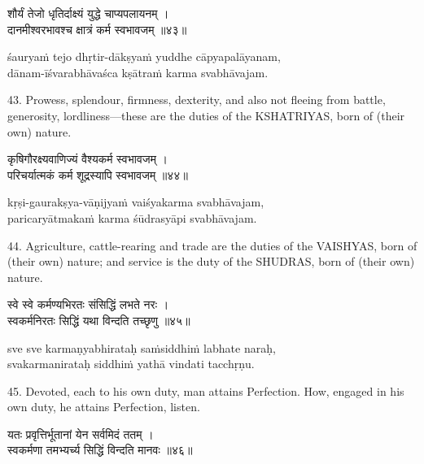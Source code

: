 \begin{gitaverse}
शौर्यं तेजो धृतिर्दाक्ष्यं युद्धे चाप्यपलायनम् । \\
दानमीश्वरभावश्च क्षात्रं कर्म स्वभावजम् ॥४३॥
\end{gitaverse}

\begin{transliteration}
śauryaṁ tejo dhṛtir-dākṣyaṁ yuddhe cāpyapalāyanam, \\
dānam-īśvarabhāvaśca kṣātraṁ karma svabhāvajam.
\end{transliteration}

43. Prowess, splendour, firmness, dexterity, and also not fleeing from battle,
generosity, lordliness---these are the duties of the KSHATRIYAS, born of (their
own) nature.

\begin{gitaverse}
कृषिगौरक्ष्यवाणिज्यं वैश्यकर्म स्वभावजम् । \\
परिचर्यात्मकं कर्म शूद्रस्यापि स्वभावजम् ॥४४॥
\end{gitaverse}

\begin{transliteration}
kṛṣi-gaurakṣya-vāṇijyaṁ vaiśyakarma svabhāvajam, \\
paricaryātmakaṁ karma śūdrasyāpi svabhāvajam.
\end{transliteration}

44. Agriculture, cattle-rearing and trade are the duties of the VAISHYAS, born
of (their own) nature; and service is the duty of the SHUDRAS, born of (their
own) nature.

\begin{gitaverse}
स्वे स्वे कर्मण्यभिरतः संसिद्धिं लभते नरः । \\
स्वकर्मनिरतः सिद्धिं यथा विन्दति तच्छृणु ॥४५॥
\end{gitaverse}

\begin{transliteration}
sve sve karmaṇyabhirataḥ saṁsiddhiṁ labhate naraḥ, \\
svakarmanirataḥ siddhiṁ yathā vindati tacchṛṇu.
\end{transliteration}

45. Devoted, each to his own duty, man attains Perfection. How, engaged in his
own duty, he attains Perfection, listen.

\begin{gitaverse}
यतः प्रवृत्तिर्भूतानां येन सर्वमिदं ततम् । \\
स्वकर्मणा तमभ्यर्च्य सिद्धिं विन्दति मानवः ॥४६॥
\end{gitaverse}

